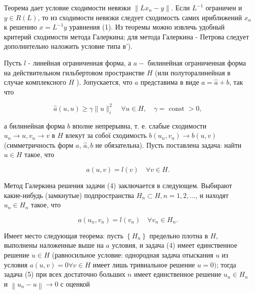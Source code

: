 \documentclass[10pt]{article}
\begin{document}
Теорема дает условие сходимости невязки $\left\|L x_{n}-y\right\|$. Если $L^{-1}$ ограничен и $y \in R(L)$, то из сходимости невязки следует сходимость самих ириближений $x_{n}$ к решению $x=L^{-1} y$ уравнения (1). Из теоремы можно извлечь удобный критерий сходимости метода Галеркина; для метода Галеркина - Петрова следует дополнительно наложить условие типа в').



Пусть $l$ - линейная ограниченная форма, а $a-$ билинейная ограниченная форма на действительном гильбертовом пространстве $H$ (или полуторалинейная в случае комплексного $H$ ). Јопускается, что $a$ представима в виде $a=\hat{a}+b$, так что



\[

\hat{a}(u, u) \geqslant \gamma\|u\|_{i}^{2} \quad \forall u \in H, \quad \gamma=\text { const }>0,

\]



а билинейная форма $b$ вполне непрерывна, т. е. слабые сходимости $u_{n} \rightarrow u, v_{n} \rightarrow v$ в $H$ влекут за собої сходимость $b\left(u_{n}, v_{n}\right) \rightarrow b(u, v)$ (симметричность форм $a$, $\hat{a}, b$ не обязательна). Пусть поставлена задача: найти $u \in H$ такое, что



\[

a(u, v)=l(v) \quad \forall v \in H .

\]



Метод Галеркина решения задачи (4) заключается в следующем. Выбирают какие-нибудь (замкнутые) подпространства $H_{n} \subset H, n=1,2, \ldots$, и находят $u_{n} \in H_{n}$ такое, что



\[

a\left(u_{n}, v_{n}\right)=l\left(v_{n}\right) \quad \forall v_{n} \in H_{n} .

\]



Имеет место следующая теорема: пусть $\left\{H_{n}\right\}$ предельно плотна в $H$, выполнены наложенные выше на $a$ условия, и задача (4) имеет единственное решение $u \in H$ (равносильное условие: однородная задача отыскания $u$ из условия $a(u, v)=0 \forall v \in H$ имеет лишь тривиальное решение $u=0)$; тогда задача (5) при всех достаточно больших $n$ имеет единственное решение $u_{n} \in H_{n}$ и $\left\|u_{n}-u\right\| \rightarrow 0$ с оценкой
\end{document}
